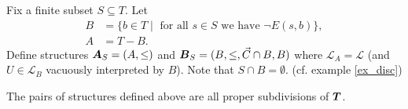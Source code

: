 \documentclass{amsart}
\DeclareMathOperator{\TT}{\boldface T}
\DeclareMathOperator{\A}{\boldface A}
\DeclareMathOperator{\B}{\boldface B}
\renewcommand{\LL}{\mathcal L}
\begin{document}
\begin{Definition}
  Fix  a finite subset $S \subseteq T$. Let
  \begin{align*}
    B &= \{b \in T \mid \text{ for all $s \in S$ we have } \neg E(s, b)\}, \\
    A &= T - B.
  \end{align*}
  Define structures $\A_{S} = (A, \leq)$ and $\B_{S} = (B, \leq, \vec C\cap B, B)$ where $\LL_A = \LL$ (and $U \in \LL_B$ vacuously interpreted by $B$). Note that $S \cap B = \emptyset$. (cf. example \ref{ex_disc})
\end{Definition}

\begin{Lemma} \label{subdivide}
  The pairs of structures defined above are all proper subdivisions of $\TT$.
\end{Lemma}
\end{document}
